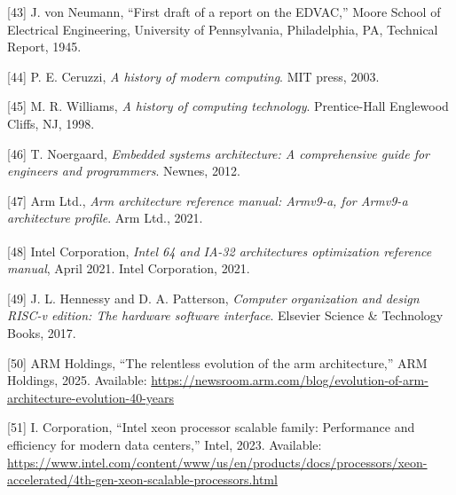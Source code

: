 \documentclass[12pt,oneside]{templates/unerthesis}
\newcommand{\CSLLeftMargin}[1]{#1} %
\newcommand{\CSLRightInline}[1]{#1} %
\newlength{\cslhangindent}
\newenvironment{CSLReferences}[2] %
 {\setlength{\parindent}{0pt}%
  \setlength{\leftskip}{#1 pt\relax}%
  \setlength{\parskip}{#2 pt\relax}%
  \everypar{\setlength{\hangindent}{\cslhangindent}}}
 {\par}
\begin{document}
\begin{CSLReferences}{0}{0}
\leavevmode{}%
\CSLLeftMargin{{[}43{]} }%
\CSLRightInline{J. von Neumann, {``First draft of a report on the {EDVAC},''} Moore School of Electrical Engineering, University of Pennsylvania, Philadelphia, PA, Technical Report, 1945.}

\leavevmode{}%
\CSLLeftMargin{{[}44{]} }%
\CSLRightInline{P. E. Ceruzzi, \emph{A history of modern computing}. MIT press, 2003.}

\leavevmode{}%
\CSLLeftMargin{{[}45{]} }%
\CSLRightInline{M. R. Williams, \emph{A history of computing technology}. Prentice-Hall Englewood Cliffs, NJ, 1998.}

\leavevmode{}%
\CSLLeftMargin{{[}46{]} }%
\CSLRightInline{T. Noergaard, \emph{Embedded systems architecture: A comprehensive guide for engineers and programmers}. Newnes, 2012.}

\leavevmode{}%
\CSLLeftMargin{{[}47{]} }%
\CSLRightInline{Arm Ltd., \emph{Arm architecture reference manual: Armv9-a, for Armv9-a architecture profile}. Arm Ltd., 2021.}

\leavevmode{}%
\CSLLeftMargin{{[}48{]} }%
\CSLRightInline{Intel Corporation, \emph{Intel\textsuperscript{\textregistered} 64 and IA-32 architectures optimization reference manual}, April 2021. Intel Corporation, 2021.}

\leavevmode{}%
\CSLLeftMargin{{[}49{]} }%
\CSLRightInline{J. L. Hennessy and D. A. Patterson, \emph{Computer organization and design RISC-v edition: The hardware software interface}. Elsevier Science \& Technology Books, 2017.}

\leavevmode{}%
\CSLLeftMargin{{[}50{]} }%
\CSLRightInline{ARM Holdings, {``The relentless evolution of the arm architecture,''} ARM Holdings, 2025. Available: \url{https://newsroom.arm.com/blog/evolution-of-arm-architecture-evolution-40-years}}

\leavevmode{}%
\CSLLeftMargin{{[}51{]} }%
\CSLRightInline{I. Corporation, {``Intel xeon processor scalable family: Performance and efficiency for modern data centers,''} Intel, 2023. Available: \url{https://www.intel.com/content/www/us/en/products/docs/processors/xeon-accelerated/4th-gen-xeon-scalable-processors.html}}


\end{CSLReferences}
\end{document}
